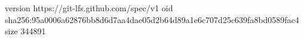 version https://git-lfs.github.com/spec/v1
oid sha256:95a0006a62876bb8d6d7aa4dae05d2b64d89a1e6c707d25c639fa8bd0589fac4
size 344891
